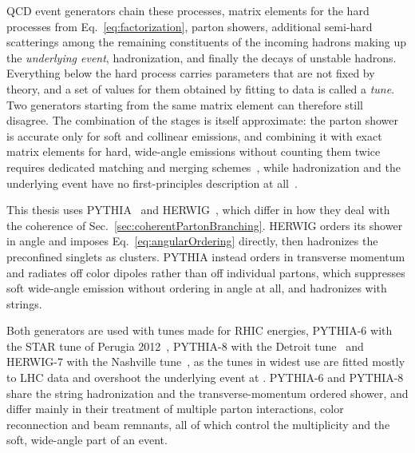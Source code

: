 QCD event generators chain these processes, matrix elements for the hard processes from Eq.~\ref{eq:factorization}, parton showers, additional semi-hard scatterings among the remaining constituents of the incoming hadrons making up the \emph{underlying event}, hadronization, and finally the decays of unstable hadrons.
%
Everything below the hard process carries parameters that are not fixed by theory, and a set of values for them obtained by fitting to data is called a \emph{tune}.
%
Two generators starting from the same matrix element can therefore still disagree.
%
The combination of the stages is itself approximate: the parton shower is accurate only for soft and collinear emissions, and combining it with exact matrix elements for hard, wide-angle emissions without counting them twice requires dedicated matching and merging schemes~\cite{Catani:2001cc,Buckley:2011ms}, while hadronization and the underlying event have no first-principles description at all~\cite{Buckley:2011ms}.

This thesis uses PYTHIA~\cite{Sj_strand_2006} and HERWIG~\cite{Bellm:2015jjp}, which differ in how they deal with the coherence of Sec.~\ref{sec:coherentPartonBranching}.
%
HERWIG orders its shower in angle and imposes Eq.~\ref{eq:angularOrdering} directly, then hadronizes the preconfined singlets as clusters.
%
PYTHIA instead orders in transverse momentum and radiates off color dipoles rather than off individual partons, which suppresses soft wide-angle emission without ordering in angle at all, and hadronizes with strings.
%

Both generators are used with tunes made for RHIC energies, PYTHIA\mbox{-}6 with the STAR tune of Perugia 2012~\cite{Skands_2010,adkins2019studying}, PYTHIA\mbox{-}8 with the Detroit tune~\cite{PhysRevD.105.016011} and HERWIG\mbox{-}7 with the Nashville tune~\cite{Qureshi:2024eqz}, as the tunes in widest use are fitted mostly to LHC data and overshoot the underlying event at .
%
PYTHIA\mbox{-}6 and PYTHIA\mbox{-}8 share the string hadronization and the transverse-momentum ordered shower, and differ mainly in their treatment of multiple parton interactions, color reconnection and beam remnants, all of which control the multiplicity and the soft, wide-angle part of an event.
%

